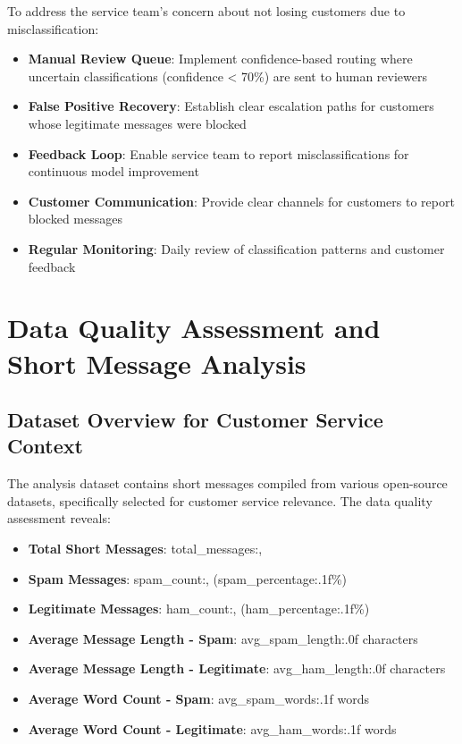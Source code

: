 \documentclass[12pt,a4paper]{article}
\begin{document}
To address the service team's concern about not losing customers due to misclassification:

\begin{itemize}
    \item \textbf{Manual Review Queue}: Implement confidence-based routing where uncertain classifications (confidence < 70\%) are sent to human reviewers
    \item \textbf{False Positive Recovery}: Establish clear escalation paths for customers whose legitimate messages were blocked
    \item \textbf{Feedback Loop}: Enable service team to report misclassifications for continuous model improvement
    \item \textbf{Customer Communication}: Provide clear channels for customers to report blocked messages
    \item \textbf{Regular Monitoring}: Daily review of classification patterns and customer feedback
\end{itemize}

\section{Data Quality Assessment and Short Message Analysis}

\subsection{Dataset Overview for Customer Service Context}

The analysis dataset contains short messages compiled from various open-source datasets, specifically selected for customer service relevance. The data quality assessment reveals:

\begin{itemize}
    \item \textbf{Total Short Messages}: {total_messages:,}
    \item \textbf{Spam Messages}: {spam_count:,} ({spam_percentage:.1f}\%)
    \item \textbf{Legitimate Messages}: {ham_count:,} ({ham_percentage:.1f}\%)
    \item \textbf{Average Message Length - Spam}: {avg_spam_length:.0f} characters
    \item \textbf{Average Message Length - Legitimate}: {avg_ham_length:.0f} characters
    \item \textbf{Average Word Count - Spam}: {avg_spam_words:.1f} words
    \item \textbf{Average Word Count - Legitimate}: {avg_ham_words:.1f} words
\end{itemize}
\end{document}
